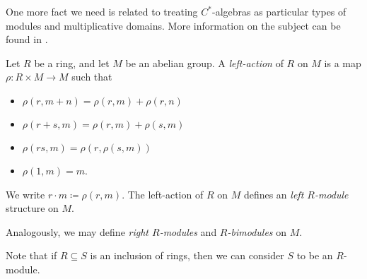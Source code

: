 One more fact we need is related to treating $C^{\ast}$-algebras as particular types of modules and multiplicative domains. More information on the subject can be found in \cite[Chapter 3]{completely_bounded_maps_and_operator_algebras}.
\begin{definition}
  Let $R$ be a ring, and let $M$ be an abelian group. A \textit{left-action} of $R$ on $M$ is a map $\rho\colon R\times M \rightarrow M$ such that
  \begin{itemize}
    \item $\rho\left( r,m+n \right) = \rho\left( r,m \right) + \rho\left( r,n \right)$
    \item $\rho\left( r + s,m \right) = \rho\left( r,m \right) + \rho\left( s,m \right)$
    \item $\rho\left( rs,m \right) = \rho\left( r,\rho\left( s,m \right) \right)$
    \item $\rho\left( 1,m \right) = m$.
  \end{itemize}
  We write $r\cdot m \coloneq \rho\left( r,m \right)$. The left-action of $R$ on $M$ defines an \textit{left $R$-module} structure on $M$.\newline

  Analogously, we may define \textit{right $R$-modules} and \textit{$R$-bimodules} on $M$.
\end{definition}
Note that if $R\subseteq S$ is an inclusion of rings, then we can consider $S$ to be an $R$-module.\newline


